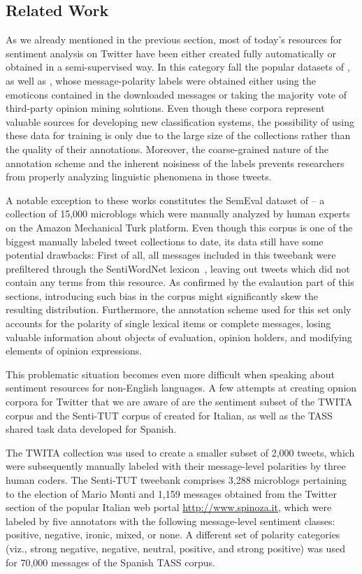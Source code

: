 \subsection{Related Work}

As we already mentioned in the previous section, most of today's
resources for sentiment analysis on Twitter have been either created
fully automatically or obtained in a semi-supervised way.  In this
category fall the popular datasets of \citet{Go:09},
\citet{Barbosa:10} as well as \citet{Pak:10}, whose message-polarity
labels were obtained either using the emoticons contained in the
downloaded messages or taking the majority vote of third-party opinion
mining solutions.  Even though these corpora represent valuable
sources for developing new classification systems, the possibility of
using these data for training is only due to the large size of the
collections rather than the quality of their annotations.  Moreover,
the coarse-grained nature of the annotation scheme and the inherent
noisiness of the labels prevents researchers from properly analyzing
linguistic phenomena in those tweets.

A notable exception to these works constitutes the SemEval dataset of
\citet{Nakov:13} -- a collection of 15,000 microblogs which were
manually analyzed by human experts on the Amazon Mechanical Turk
platform.  Even though this corpus is one of the biggest manually
labeled tweet collections to date, its data still have some potential
drawbacks: First of all, all messages included in this tweebank were
prefiltered through the SentiWordNet lexicon~\cite{Esuli:06b}, leaving
out tweets which did not contain any terms from this resource.  As
confirmed by the evalaution part of this sections, introducing such
bias in the corpus might significantly skew the resulting
distribution.  Furthermore, the annotation scheme used for this set
only accounts for the polarity of single lexical items or complete
messages, losing valuable information about objects of evaluation,
opinion holders, and modifying elements of opinion expressions.

This problematic situation becomes even more difficult when speaking
about sentiment resources for non-English languages.  A few attempts
at creating opnion corpora for Twitter that we are aware of are the
sentiment subset of the TWITA corpus \cite{Basile:13} and the
Senti-TUT corpus of \citet{Bosco:13} created for Italian, as well as
the TASS shared task data \cite{Villena-Roman:13} developed for
Spanish.

The TWITA collection was used to create a smaller subset of 2,000
tweets, which were subsequently manually labeled with their
message-level polarities by three human coders.  The Senti-TUT
tweebank comprises 3,288 microblogs pertaining to the election of
Mario Monti and 1,159 messages obtained from the Twitter section of
the popular Italian web portal
{\footnotesize\url{http://www.spinoza.it}}, which were labeled by five
annotators with the following message-level sentiment classes:
positive, negative, ironic, mixed, or none.  A different set of
polarity categories (viz., strong negative, negative, neutral,
positive, and strong positive) was used for 70,000 messages of the
Spanish TASS corpus.

